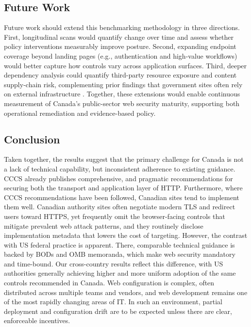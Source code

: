 \documentclass[pdflatex,sn-mathphys-num]{sn-jnl}
\numberwithin{equation}{section}
\theoremstyle{thmstyleone}
\theoremstyle{thmstyletwo}%
\theoremstyle{thmstylethree}%
\begin{document}
\subsection{Future Work}

Future work should extend this benchmarking methodology in three directions. First, longitudinal scans would
quantify change over time and assess whether policy interventions measurably improve posture. 
Second, expanding endpoint coverage beyond landing pages (e.g., authentication and high-value workflows) would better capture how
controls vary across application surfaces. Third, deeper dependency analysis could quantify third-party resource
exposure and content supply-chain risk, complementing prior findings that government sites often rely on external
infrastructure \cite{hsiao2019cyberautonomy}. Together, these extensions would enable continuous measurement of
Canada’s public-sector web security maturity, supporting both operational remediation and evidence-based policy.

\subsection{Conclusion}

\vspace{1em}Taken together, the results suggest that the primary challenge for Canada is not a lack of 
technical capability, but inconsistent adherence to existing guidance. CCCS already publishes comprehensive, 
and pragmatic recommendations for securing both the transport and application layer of HTTP. Furthermore, 
where CCCS recommendations have been followed, Canadian sites tend to implement them well. Canadian authority
 sites often negotiate modern TLS and redirect users toward HTTPS, yet frequently omit the browser-facing
controls that mitigate prevalent web attack patterns, and they routinely disclose implementation metadata that lowers the cost of targeting.
However, the contrast  with US federal practice is apparent. There, comparable technical guidance is backed by BODs and OMB 
memoranda, which make web security mandatory and time-bound. Our cross-country results 
reflect this difference, with US authorities generally achieving higher and more uniform 
adoption of the same controls recommended in Canada. Web configuration is complex, often distributed 
across multiple teams and vendors, and web development remains one of the most rapidly changing areas of IT.
In such an environment, partial deployment and configuration drift are to be expected unless there are clear, 
enforceable incentives.
\end{document}
